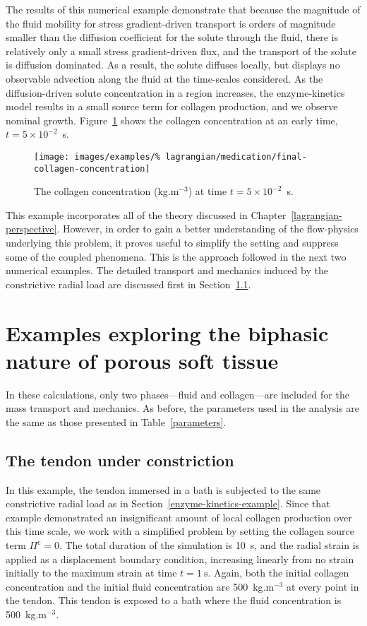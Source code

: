 The results of this numerical example demonstrate that because the
magnitude of the fluid mobility for stress gradient-driven transport
is orders of magnitude smaller than the diffusion coefficient for the
solute through the fluid, there is relatively only a small stress
gradient-driven flux, and the transport of the solute is diffusion
dominated. As a result, the solute diffuses locally, but displays no
observable advection along the fluid at the time-scales considered. As
the diffusion-driven solute concentration in a region increases, the
enzyme-kinetics model results in a small source term for collagen
production, and we observe nominal growth. Figure~\ref{eg3conc} shows
the collagen concentration at an early time, $t=5\times10^{-2}$~s.

\begin{figure}[!hpt]
  \centering
  \texttt{[image: images/examples/\%
    lagrangian/medication/final-collagen-concentration]}
  \caption{The collagen concentration (kg.m$^{-3}$) at time
    $t=5\times10^{-2}$~s.}
  \label{eg3conc}
\end{figure}

This example incorporates all of the theory discussed in
Chapter~\ref{lagrangian-perspective}. However, in order to gain a
better understanding of the flow-physics underlying this problem, it
proves useful to simplify the setting and suppress some of the coupled
phenomena. This is the approach followed in the next two numerical
examples. The detailed transport and mechanics induced by the
constrictive radial load are discussed first in
Section~\ref{constriction-1}.

\section{Examples exploring the biphasic nature of porous soft tissue}
\label{biphasic-examples-1}

In these calculations, only two phases---fluid and collagen---are
included for the mass transport and mechanics. As before, the
parameters used in the analysis are the same as those presented in
Table~\ref{parameters}.

\subsection{The tendon under constriction}
\label{constriction-1}

In this example, the tendon immersed in a bath is subjected to the
same constrictive radial load as in
Section~\ref{enzyme-kinetics-example}. Since that example demonstrated
an insignificant amount of local collagen production over this time
scale, we work with a simplified problem by setting the collagen
source term $\Pi^\mathrm{c} = 0$. The total duration of the simulation
is 10~s, and the radial strain is applied as a displacement boundary
condition, increasing linearly from no strain initially to the maximum
strain at time $t = 1~\mathrm{s}$. Again, both the initial collagen
concentration and the initial fluid concentration are 500~kg.m$^{-3}$
at every point in the tendon. This tendon is exposed to a bath where
the fluid concentration is 500~kg.m$^{-3}$.

